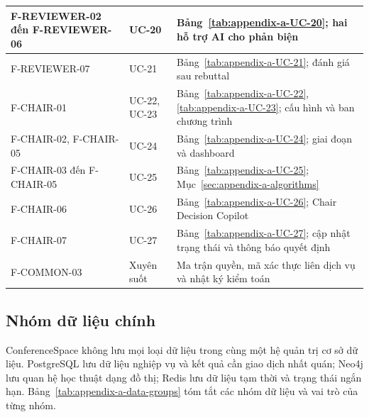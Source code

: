\begin{longtable}{|T{0.26\textwidth}|N{0.15\textwidth}|T{0.51\textwidth}|}
F-REVIEWER-02 đến F-REVIEWER-06 & UC-20 & Bảng~\ref{tab:appendix-a-UC-20}; hai hỗ trợ AI cho phản biện \\ \hline
F-REVIEWER-07 & UC-21 & Bảng~\ref{tab:appendix-a-UC-21}; đánh giá sau rebuttal \\ \hline
F-CHAIR-01 & UC-22, UC-23 & Bảng~\ref{tab:appendix-a-UC-22}, \ref{tab:appendix-a-UC-23}; cấu hình và ban chương trình \\ \hline
F-CHAIR-02, F-CHAIR-05 & UC-24 & Bảng~\ref{tab:appendix-a-UC-24}; giai đoạn và dashboard \\ \hline
F-CHAIR-03 đến F-CHAIR-05 & UC-25 & Bảng~\ref{tab:appendix-a-UC-25}; Mục~\ref{sec:appendix-a-algorithms} \\ \hline
F-CHAIR-06 & UC-26 & Bảng~\ref{tab:appendix-a-UC-26}; Chair Decision Copilot \\ \hline
F-CHAIR-07 & UC-27 & Bảng~\ref{tab:appendix-a-UC-27}; cập nhật trạng thái và thông báo quyết định \\ \hline
F-COMMON-03 & Xuyên suốt & Ma trận quyền, mã xác thực liên dịch vụ và nhật ký kiểm toán \\ \hline
\end{longtable}

\subsection{Nhóm dữ liệu chính}

ConferenceSpace không lưu mọi loại dữ liệu trong cùng một hệ quản trị cơ sở dữ liệu. PostgreSQL lưu dữ liệu nghiệp vụ và kết quả cần giao dịch nhất quán; Neo4j lưu quan hệ học thuật dạng đồ thị; Redis lưu dữ liệu tạm thời và trạng thái ngắn hạn. Bảng~\ref{tab:appendix-a-data-groups} tóm tắt các nhóm dữ liệu và vai trò của từng nhóm.

